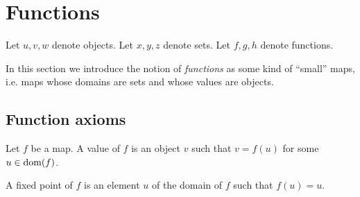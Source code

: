 \documentclass[../../set-theory.ftl.tex]{subfiles}
\begin{document}
  \begin{comment}
    \begin{forthel}

    \end{forthel}
  \end{comment}


  \section{Functions}

  \begin{forthel}
  \end{forthel}

  \begin{forthel}
    Let $u,v,w$ denote objects.
    Let $x,y,z$ denote sets.
    Let $f,g,h$ denote functions.
  \end{forthel}

  \noindent In this section we introduce the notion of \textit{functions} as
  some kind of \enquote{small} maps, i.e. maps whose domains are sets and whose
  values are objects.


  \subsection{Function axioms}

  \begin{forthel}
    \begin{definition}
      Let $f$ be a map.
      A value of $f$ is an object $v$ such that $v = f(u)$ for some $u \in \operatorname{dom}(f)$.
    \end{definition}

    \begin{definition}
      A fixed point of $f$ is an element $u$ of the domain of $f$ such that $f(u) = u$.
    \end{definition}
  \end{forthel}
\end{document}
